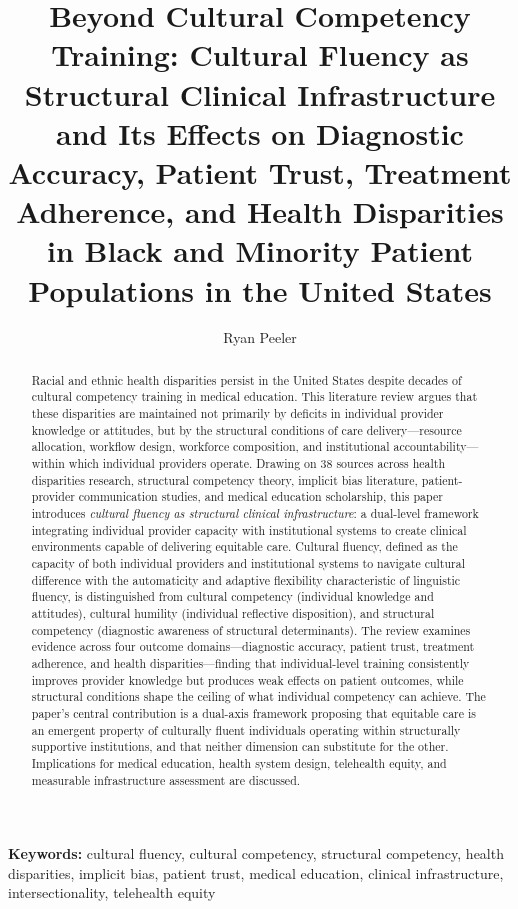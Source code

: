 \documentclass[12pt, a4paper]{article}
\title{Beyond Cultural Competency Training: Cultural Fluency as Structural Clinical Infrastructure and Its Effects on Diagnostic Accuracy, Patient Trust, Treatment Adherence, and Health Disparities in Black and Minority Patient Populations in the United States}
\author{Ryan Peeler}
\date{}
\begin{document}
\maketitle

\begin{abstract}
Racial and ethnic health disparities persist in the United States despite decades of cultural competency training in medical education. This literature review argues that these disparities are maintained not primarily by deficits in individual provider knowledge or attitudes, but by the structural conditions of care delivery---resource allocation, workflow design, workforce composition, and institutional accountability---within which individual providers operate. Drawing on 38 sources across health disparities research, structural competency theory, implicit bias literature, patient-provider communication studies, and medical education scholarship, this paper introduces \textit{cultural fluency as structural clinical infrastructure}: a dual-level framework integrating individual provider capacity with institutional systems to create clinical environments capable of delivering equitable care. Cultural fluency, defined as the capacity of both individual providers and institutional systems to navigate cultural difference with the automaticity and adaptive flexibility characteristic of linguistic fluency, is distinguished from cultural competency (individual knowledge and attitudes), cultural humility (individual reflective disposition), and structural competency (diagnostic awareness of structural determinants). The review examines evidence across four outcome domains---diagnostic accuracy, patient trust, treatment adherence, and health disparities---finding that individual-level training consistently improves provider knowledge but produces weak effects on patient outcomes, while structural conditions shape the ceiling of what individual competency can achieve. The paper's central contribution is a dual-axis framework proposing that equitable care is an emergent property of culturally fluent individuals operating within structurally supportive institutions, and that neither dimension can substitute for the other. Implications for medical education, health system design, telehealth equity, and measurable infrastructure assessment are discussed.
\end{abstract}

\noindent\textbf{Keywords:} cultural fluency, cultural competency, structural competency, health disparities, implicit bias, patient trust, medical education, clinical infrastructure, intersectionality, telehealth equity
\end{document}
